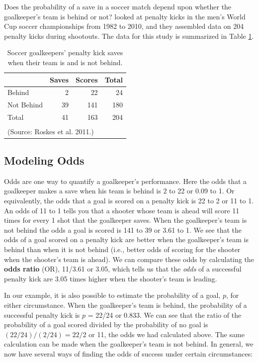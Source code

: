 \documentclass[
]{krantz}
\begin{document}
Does the probability of a save in a soccer match depend upon whether the goalkeeper's team is behind or not? \citet{Roskes2011} looked at penalty kicks in the men's World Cup soccer championships from 1982 to 2010, and they assembled data on 204 penalty kicks during shootouts. The data for this study is summarized in Table \ref{tab:table1chp6}.

\begin{table}
\centering
\caption{\label{tab:table1chp6}Soccer goalkeepers' penalty kick saves when their team is and is not behind.}
\centering
\begin{tabular}[t]{lrrr}
\toprule
  & Saves & Scores & Total\\
\midrule
Behind & 2 & 22 & 24\\
Not Behind & 39 & 141 & 180\\
Total & 41 & 163 & 204\\
\bottomrule
\multicolumn{4}{l}{\textsuperscript{} (Source: Roskes et al. 2011.)}\\
\end{tabular}
\end{table}

\subsection{Modeling Odds}\label{modeling-odds}

Odds are one way to quantify a goalkeeper's performance. Here the odds that a goalkeeper makes a save when his team is behind is 2 to 22 or 0.09 to 1. Or equivalently, the odds that a goal is scored on a penalty kick is 22 to 2 or 11 to 1. An odds of 11 to 1 tells you that a shooter whose team is ahead will score 11 times for every 1 shot that the goalkeeper saves. When the goalkeeper's team is not behind the odds a goal is scored is 141 to 39 or 3.61 to 1. We see that the odds of a goal scored on a penalty kick are better when the goalkeeper's team is behind than when it is not behind (i.e., better odds of scoring for the shooter when the shooter's team is ahead). We can compare these odds by calculating the \textbf{odds ratio}  (OR), 11/3.61 or 3.05, which tells us that the \emph{odds} of a successful penalty kick are 3.05 times higher when the shooter's team is leading.

In our example, it is also possible to estimate the probability of a goal, \(p\), for either circumstance. When the goalkeeper's team is behind, the probability of a successful penalty kick is \(p\) = 22/24 or 0.833. We can see that the ratio of the probability of a goal scored divided by the probability of no goal is \((22/24)/(2/24)=22/2\) or 11, the odds we had calculated above. The same calculation can be made when the goalkeeper's team is not behind. In general, we now have several ways of finding the odds of success under certain circumstances:
\end{document}
